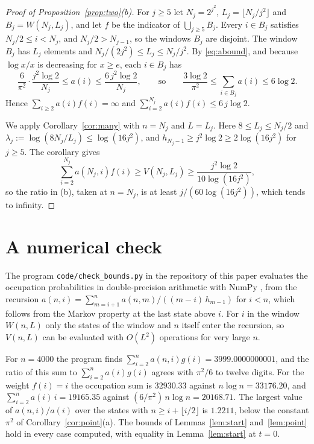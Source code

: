 \documentclass[11pt]{amsart}
\theoremstyle{remark}
\numberwithin{equation}{section}
\begin{document}
\begin{proof}[Proof of Proposition~\ref{prop:two}(b)]
For $j\ge5$ let $N_j=2^{j^2}$, $L_j=\lfloor N_j/j^2\rfloor$ and $B_j=W(N_j,L_j)$, and let $f$ be the indicator of
$\bigcup_{j\ge5}B_j$. Every $i\in B_j$ satisfies $N_j/2\le i<N_j$, and $N_j/2>N_{j-1}$, so the windows $B_j$ are
disjoint. The window $B_j$ has $L_j$ elements and $N_j/(2j^2)\le L_j\le N_j/j^2$. By \eqref{eq:abound}, and because
$\log x/x$ is decreasing for $x\ge e$, each $i\in B_j$ has
\[
\frac{6}{\pi^2}\cdot\frac{j^2\log2}{N_j}\le a(i)\le\frac{6\,j^2\log2}{N_j},
\qquad\text{so}\qquad\frac{3\log2}{\pi^2}\le\sum_{i\in B_j}a(i)\le6\log2 .
\]
Hence $\sum_{i\ge2}a(i)f(i)=\infty$ and $\sum_{i=2}^{N_j}a(i)f(i)\le6\,j\log2$.

We apply Corollary~\ref{cor:many} with $n=N_j$ and $L=L_j$. Here $8\le L_j\le N_j/2$ and
$\lambda_j:=\log(8N_j/L_j)\le\log(16j^2)$, and $h_{N_j-1}\ge j^2\log2\ge2\log(16j^2)$ for $j\ge5$. The corollary gives
\[
\sum_{i=2}^{N_j}a(N_j,i)f(i)\ge V(N_j,L_j)\ge\frac{j^2\log2}{10\log(16j^2)} ,
\]
so the ratio in (b), taken at $n=N_j$, is at least $j/(60\log(16j^2))$, which tends to infinity.
\end{proof}

\section{A numerical check}\label{sec:num}

The program \texttt{code/check\_bounds.py} in the repository of this paper evaluates the occupation probabilities in
double-precision arithmetic with NumPy \cite{NumPy}, from the recursion
$a(n,i)=\sum_{m=i+1}^{n}a(n,m)/((m-i)\,h_{m-1})$ for $i<n$, which follows from the Markov property at the last state
above $i$. For $i$ in the window $W(n,L)$ only the states of the window and $n$ itself enter the recursion, so $V(n,L)$
can be evaluated with $O(L^2)$ operations for very large $n$.

For $n=4000$ the program finds $\sum_{i=2}^{n}a(n,i)g(i)=3999.0000000001$, and the ratio of this sum to
$\sum_{i=2}^{n}a(i)g(i)$ agrees with $\pi^2/6$ to twelve digits. For the weight $f(i)=i$ the occupation sum is
$32930.33$ against $n\log n=33176.20$, and $\sum_{i=2}^{n}a(i)\,i=19165.35$ against $(6/\pi^2)\,n\log n=20168.71$. The
largest value of $a(n,i)/a(i)$ over the states with $n\ge i+\lfloor i/2\rfloor$ is $1.2211$, below the constant
$\pi^2$ of Corollary~\ref{cor:point}(a). The bounds of Lemmas~\ref{lem:start} and~\ref{lem:point} hold in every case
computed, with equality in Lemma~\ref{lem:start} at $t=0$.
\end{document}
